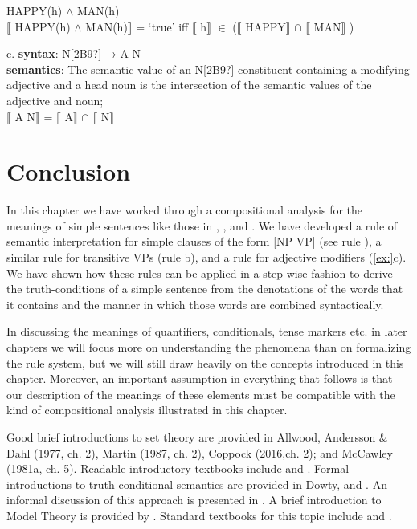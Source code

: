 \ea
\ea  HAPPY(h) $\wedge$ MAN(h)\\
\ex  $\llbracket$ HAPPY(h) $\wedge$ MAN(h)$\rrbracket$  = ‘true’  iff  $\llbracket$ h$\rrbracket$  ${\in}$ ($\llbracket$ HAPPY$\rrbracket$  ${\cap}$ $\llbracket$ MAN$\rrbracket$ )
                       \z
\z

\ea
  c.  \textbf{syntax}: N[2B9?]  →  A N\\
\textbf{semantics}: The semantic value of an N[2B9?] constituent containing a modifying adjective and a head noun is the intersection of the semantic values of the adjective and noun;\\
{}$\llbracket$ A N$\rrbracket$  =  $\llbracket$ A$\rrbracket$  ${\cap}$ $\llbracket$ N$\rrbracket$ 
\z

\section{Conclusion}\label{sec:13.6}

In this chapter we have worked through a compositional analysis for the meanings of simple sentences like those in , , and . We have developed a rule of semantic interpretation for simple clauses of the form [NP VP] (see rule ), a similar rule for transitive VPs (rule b), and a rule for adjective modifiers (\ref{ex:}c). We have shown how these rules can be applied in a step-wise fashion to derive the truth-conditions of a simple sentence from the denotations of the words that it contains and the manner in which those words are combined syntactically.



In discussing the meanings of quantifiers, conditionals, tense markers etc. in later chapters we will focus more on understanding the phenomena than on formalizing the rule system, but we will still draw heavily on the concepts introduced in this chapter. Moreover, an important assumption in everything that follows is that our description of the meanings of these elements must be compatible with the kind of compositional analysis illustrated in this chapter.



\furtherreading



Good brief introductions to set theory are provided in Allwood, Andersson \& Dahl (1977, ch. 2), Martin (1987, ch. 2), Coppock (2016,ch. 2); and McCawley (1981a, ch. 5). Readable introductory textbooks include \citet{Halmos1960} and \citet{Enderton1977}. Formal introductions to truth-conditional semantics are provided in Dowty, \citet{WallPeters1981} and \citet{HeimKratzer1998}. An informal discussion of this approach is presented in \citet{Bach1989}. A brief introduction to Model Theory is provided by \citet{Hodges2013}. Standard textbooks for this topic include \citet{ChangKeisler1990} and \citet{Hodges1997}.


